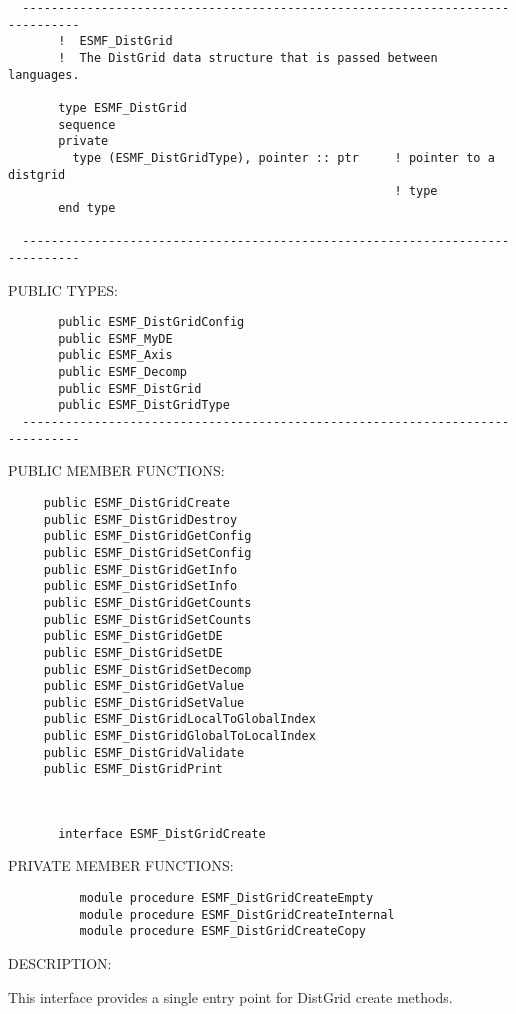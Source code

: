 \begin{verbatim}
  ------------------------------------------------------------------------------
       !  ESMF_DistGrid
       !  The DistGrid data structure that is passed between languages.
 
       type ESMF_DistGrid
       sequence
       private
         type (ESMF_DistGridType), pointer :: ptr     ! pointer to a distgrid
                                                      ! type
       end type
 
  ------------------------------------------------------------------------------\end{verbatim}{\sf PUBLIC TYPES:}
\begin{verbatim}       public ESMF_DistGridConfig
       public ESMF_MyDE
       public ESMF_Axis
       public ESMF_Decomp
       public ESMF_DistGrid
       public ESMF_DistGridType
  ------------------------------------------------------------------------------\end{verbatim}{\sf PUBLIC MEMBER FUNCTIONS:}
\begin{verbatim}     public ESMF_DistGridCreate
     public ESMF_DistGridDestroy
     public ESMF_DistGridGetConfig
     public ESMF_DistGridSetConfig
     public ESMF_DistGridGetInfo
     public ESMF_DistGridSetInfo
     public ESMF_DistGridGetCounts
     public ESMF_DistGridSetCounts
     public ESMF_DistGridGetDE
     public ESMF_DistGridSetDE
     public ESMF_DistGridSetDecomp
     public ESMF_DistGridGetValue
     public ESMF_DistGridSetValue
     public ESMF_DistGridLocalToGlobalIndex
     public ESMF_DistGridGlobalToLocalIndex
     public ESMF_DistGridValidate
     public ESMF_DistGridPrint
  \end{verbatim}
 
 
\mbox{}\hrulefill\ 
 

\begin{verbatim}       interface ESMF_DistGridCreate 
 \end{verbatim}{\sf PRIVATE MEMBER FUNCTIONS:}
\begin{verbatim}          module procedure ESMF_DistGridCreateEmpty
          module procedure ESMF_DistGridCreateInternal
          module procedure ESMF_DistGridCreateCopy
 \end{verbatim}
{\sf DESCRIPTION:\\ }


       This interface provides a single entry point for DistGrid create
       methods.
   
